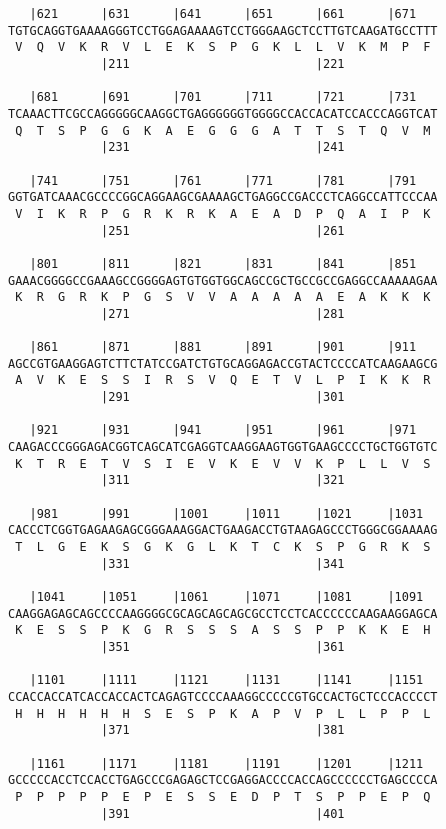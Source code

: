 \documentclass{article}
\begin{document}
\begin{Verbatim}
   |621      |631      |641      |651      |661      |671   
TGTGCAGGTGAAAAGGGTCCTGGAGAAAAGTCCTGGGAAGCTCCTTGTCAAGATGCCTTT
 V  Q  V  K  R  V  L  E  K  S  P  G  K  L  L  V  K  M  P  F 
             |211                          |221             
  
   |681      |691      |701      |711      |721      |731   
TCAAACTTCGCCAGGGGGCAAGGCTGAGGGGGGTGGGGCCACCACATCCACCCAGGTCAT
 Q  T  S  P  G  G  K  A  E  G  G  G  A  T  T  S  T  Q  V  M 
             |231                          |241             
  
   |741      |751      |761      |771      |781      |791   
GGTGATCAAACGCCCCGGCAGGAAGCGAAAAGCTGAGGCCGACCCTCAGGCCATTCCCAA
 V  I  K  R  P  G  R  K  R  K  A  E  A  D  P  Q  A  I  P  K 
             |251                          |261             
  
   |801      |811      |821      |831      |841      |851   
GAAACGGGGCCGAAAGCCGGGGAGTGTGGTGGCAGCCGCTGCCGCCGAGGCCAAAAAGAA
 K  R  G  R  K  P  G  S  V  V  A  A  A  A  A  E  A  K  K  K 
             |271                          |281             
  
   |861      |871      |881      |891      |901      |911   
AGCCGTGAAGGAGTCTTCTATCCGATCTGTGCAGGAGACCGTACTCCCCATCAAGAAGCG
 A  V  K  E  S  S  I  R  S  V  Q  E  T  V  L  P  I  K  K  R 
             |291                          |301             
  
   |921      |931      |941      |951      |961      |971   
CAAGACCCGGGAGACGGTCAGCATCGAGGTCAAGGAAGTGGTGAAGCCCCTGCTGGTGTC
 K  T  R  E  T  V  S  I  E  V  K  E  V  V  K  P  L  L  V  S 
             |311                          |321             
  
   |981      |991      |1001     |1011     |1021     |1031  
CACCCTCGGTGAGAAGAGCGGGAAAGGACTGAAGACCTGTAAGAGCCCTGGGCGGAAAAG
 T  L  G  E  K  S  G  K  G  L  K  T  C  K  S  P  G  R  K  S 
             |331                          |341             
  
   |1041     |1051     |1061     |1071     |1081     |1091  
CAAGGAGAGCAGCCCCAAGGGGCGCAGCAGCAGCGCCTCCTCACCCCCCAAGAAGGAGCA
 K  E  S  S  P  K  G  R  S  S  S  A  S  S  P  P  K  K  E  H 
             |351                          |361             
  
   |1101     |1111     |1121     |1131     |1141     |1151  
CCACCACCATCACCACCACTCAGAGTCCCCAAAGGCCCCCGTGCCACTGCTCCCACCCCT
 H  H  H  H  H  H  S  E  S  P  K  A  P  V  P  L  L  P  P  L 
             |371                          |381             
  
   |1161     |1171     |1181     |1191     |1201     |1211  
GCCCCCACCTCCACCTGAGCCCGAGAGCTCCGAGGACCCCACCAGCCCCCCTGAGCCCCA
 P  P  P  P  P  E  P  E  S  S  E  D  P  T  S  P  P  E  P  Q 
             |391                          |401             
  

\end{Verbatim}
\end{document}
